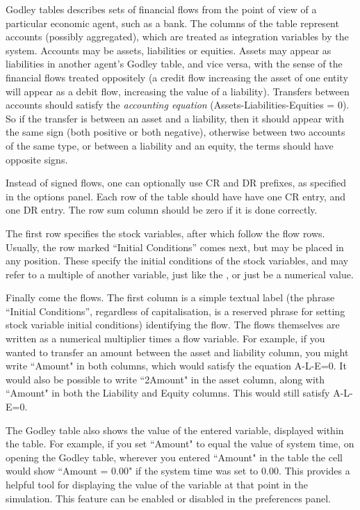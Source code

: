 \label{godley}\label{GodleyIcon}

Godley tables describes sets of financial flows from the point of
view of a particular economic agent, such as a bank. The columns of
the table represent accounts (possibly aggregated), which are treated
as integration variables by the system. Accounts may be assets, liabilities
or equities. Assets may appear as liabilities in another agent's Godley
table, and vice versa, with the sense of the financial flows treated
oppositely (a credit flow increasing the asset of one entity will
appear as a debit flow, increasing the value of a liability). Transfers
between accounts should satisfy the {\em accounting equation}
(Assets-Liabilities-Equities = 0). So if the transfer is between an
asset and a liability, then it should appear with the same sign (both
positive or both negative), otherwise between two accounts of the
same type, or between a liability and an equity, the terms should
have opposite signs.

Instead of signed flows, one can optionally use CR and DR prefixes,
as specified in the options panel. Each row of the table should have
have one CR entry, and one DR entry. The row sum column should be
zero if it is done correctly.

The first row specifies the stock variables, after which follow the
flow rows. Usually, the row marked ``Initial Conditions'' comes
next, but may be placed in any position. These specify the initial
conditions of the stock variables, and may refer to a multiple of
another variable, just like the ,
or just be a numerical value.

Finally come the flows. The first column is a simple textual label
(the phrase ``Initial Conditions'', regardless of capitalisation,
is a reserved phrase for setting stock variable initial conditions)
identifying the flow. The flows themselves are written as a numerical
multiplier times a flow variable. For example, if you wanted to transfer
an amount between the asset and liability column, you might write
``Amount" in both columns, which would satisfy the equation A-L-E=0.
It would also be possible to write ``2Amount" in the asset column,
along with ``Amount" in both the Liability and Equity columns. This
would still satisfy A-L-E=0.

The Godley table also shows the value of the entered variable, displayed
within the table. For example, if you set ``Amount" to equal the
value of system time, on opening the Godley table, wherever you entered
``Amount" in the table the cell would show ``Amount = 0.00" if
the system time was set to 0.00. This provides a helpful tool for
displaying the value of the variable at that point in the simulation.
This feature can be enabled or disabled in the preferences panel.

